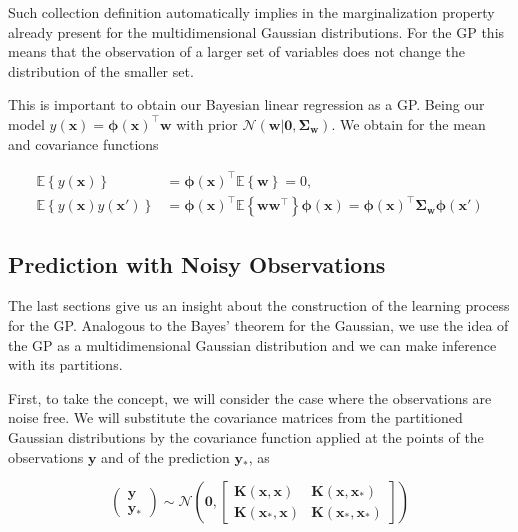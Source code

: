 \documentclass[11pt]{article} %
\begin{document}
Such collection definition automatically implies in the marginalization property already present for the multidimensional Gaussian distributions. For the GP this means that the observation of a larger set of variables does not change the distribution of the smaller set.

This is important to obtain our Bayesian linear regression as a GP. Being our model $y(\mathbf{x})=\boldsymbol{\phi}(\mathbf{x})^\top \mathbf{w}$ with prior $\mathcal{N}\left( \mathbf{w} | \mathbf{0}, \boldsymbol{\Sigma}_{\mathbf{w}}\right)$. We obtain for the mean and covariance functions

\begin{equation}
   \label{eq:gau-pro-mean-cov}
   \begin{aligned}
      \mathbb{E}\left\{ y(\mathbf{x}) \right\} &= \boldsymbol{\phi}(\mathbf{x})^\top \mathbb{E} \left\{ \mathbf{w} \right\} = 0,\\
      \mathbb{E}\left\{ y(\mathbf{x})y(\mathbf{x'}) \right\} &= \boldsymbol{\phi}(\mathbf{x})^\top \mathbb{E} \left\{ \mathbf{ww}^\top \right\}\boldsymbol{\phi}(\mathbf{x}) = \boldsymbol{\phi}(\mathbf{x})^\top \boldsymbol{\Sigma}_{\mathbf{w}} \boldsymbol{\phi}(\mathbf{x'})
   \end{aligned}
\end{equation}

\subsection{Prediction with Noisy Observations}

The last sections give us an insight about the construction of the learning process for the GP. Analogous to the Bayes' theorem for the Gaussian, we use the idea of the GP as a multidimensional Gaussian distribution and we can make inference with its partitions. 

First, to take the concept, we will consider the case where the observations are noise free. We will substitute the covariance matrices from the partitioned Gaussian distributions by the covariance function applied at the points of the observations $\mathbf{y}$ and of the prediction $\mathbf{y_*}$, as

\begin{equation}
   \left( \begin{array}{l}{\mathbf{y}}  \\ {\mathbf{y}_*} \end{array} \right) 
   \sim
   \mathcal{N} \left( \mathbf{0}, \left[ \begin{array}{ll}{\mathbf{K}(\mathbf{x},\mathbf{x})} & {\mathbf{K}(\mathbf{x},\mathbf{x_*})} \\ {\mathbf{K}(\mathbf{x_*},\mathbf{x})} & {\mathbf{K}(\mathbf{x_*},\mathbf{x_*})}\end{array} \right] \right)
\end{equation}
\end{document}
